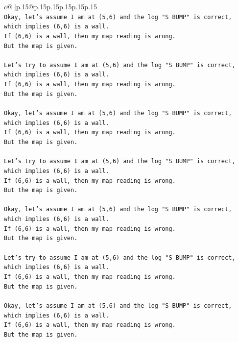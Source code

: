 \documentclass{article}
\begin{document}
{\begin{supertabular}{c@{$\;$}|p{.15\linewidth}@{}p{.15\linewidth}p{.15\linewidth}p{.15\linewidth}p{.15\linewidth}p{.15\linewidth}}
{{{\\ 
\texttt{Okay, let's assume I am at (5,6) and the log "S BUMP" is correct, which implies (6,6) is a wall.} \\
\texttt{If (6,6) is a wall, then my map reading is wrong.} \\
\texttt{But the map is given.} \\
\\ 
\texttt{Let's try to assume I am at (5,6) and the log "S BUMP" is correct, which implies (6,6) is a wall.} \\
\texttt{If (6,6) is a wall, then my map reading is wrong.} \\
\texttt{But the map is given.} \\
\\ 
\texttt{Okay, let's assume I am at (5,6) and the log "S BUMP" is correct, which implies (6,6) is a wall.} \\
\texttt{If (6,6) is a wall, then my map reading is wrong.} \\
\texttt{But the map is given.} \\
\\ 
\texttt{Let's try to assume I am at (5,6) and the log "S BUMP" is correct, which implies (6,6) is a wall.} \\
\texttt{If (6,6) is a wall, then my map reading is wrong.} \\
\texttt{But the map is given.} \\
\\ 
\texttt{Okay, let's assume I am at (5,6) and the log "S BUMP" is correct, which implies (6,6) is a wall.} \\
\texttt{If (6,6) is a wall, then my map reading is wrong.} \\
\texttt{But the map is given.} \\
\\ 
\texttt{Let's try to assume I am at (5,6) and the log "S BUMP" is correct, which implies (6,6) is a wall.} \\
\texttt{If (6,6) is a wall, then my map reading is wrong.} \\
\texttt{But the map is given.} \\
\\ 
\texttt{Okay, let's assume I am at (5,6) and the log "S BUMP" is correct, which implies (6,6) is a wall.} \\
\texttt{If (6,6) is a wall, then my map reading is wrong.} \\
\texttt{But the map is given.} \\
\\ 
}}}
\end{supertabular}}
\end{document}
